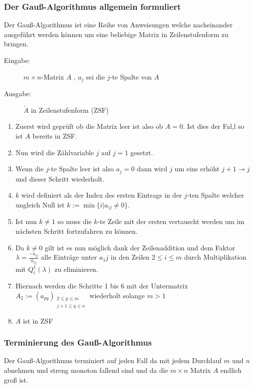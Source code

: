 \subsubsection{Der Gauß-Algorithmus allgemein formuliert}
Der Gauß-Algorithmus ist eine Reihe von Anweisungen welche nacheinander ausgeführt werden können um eine beliebige Matrix in Zeilenstufenform zu bringen.
\begin{Algo}

	\begin{description}
		\item[Eingabe:] $m \times n $-Matrix $A$ , $a_j$ sei die $j$-te Spalte von $A$
		\item[Ausgabe:] $\tilde{A}$ in Zeilenstufenform (ZSF)
	\end{description}
	
	\begin{enumerate}
		\item Zuerst wird geprüft ob die Matrix leer ist also ob $A=0$. Ist dies der Fal,l so ist $A$ bereits in ZSF.
		\item Nun wird die Zählvariable $j$ auf $j=1$ gesetzt.
		\item Wenn die $j$-te Spalte leer ist also $a_j=0$ dann wird $j$ um eins erhöht $j+1\rightarrow j$ und dieser Schritt wiederholt.
		\item $k$ wird definiert als der Index des ersten Eintrags in der $j$-ten Spalte welcher ungleich Null ist $k:=\min\{i|a_{ij}\neq0\}$.
		\item Ist nun $k\neq1$ so muss die $k$-te Zeile mit der ersten vertauscht werden um im nächsten Schritt fortzufahren zu können.
		\item Da $k\neq0$ gilt ist es nun möglich dank der Zeilenaddition und dem Faktor $\lambda=\frac{-a_{ij}}{\bar{a}_{1j}}$ alle Einträge unter $a_1j$ in den Zeilen $2\leq{i}\leq{m}$ durch Multiplikation mit $Q_i^1(\lambda)$ zu eliminieren.
		\item Hiernach werden die Schritte 1 bis 6 mit der Untermatrix $A_2:=(a_{pq})_{\substack{2\leq p\leq m\\ j+1 \leq q \leq n}}$ wiederholt solange $m>1$
		\item $A$ ist in ZSF 
	\end{enumerate}
\end{Algo}
\subsubsection{Terminierung des Gauß-Algorithmus}
	Der Gauß-Algorithmus terminiert auf jeden Fall da mit jedem Durchlauf $m$ und $n$ abnehmen und streng monoton fallend sind und da die $m \times n$ Matrix $A$ endlich groß ist. 
